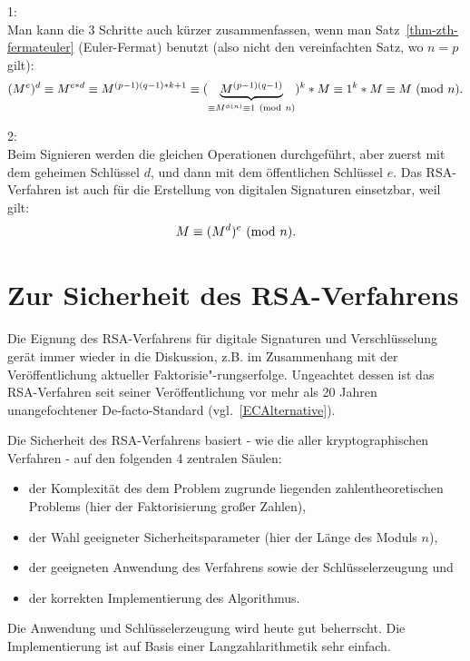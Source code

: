 \begin{refsegment}
\begin{remark}{ 1:}\\
Man kann die 3 Schritte auch kürzer zusammenfassen, wenn man
Satz~\ref{thm-zth-fermateuler} (Euler-Fermat) benutzt (also nicht den
vereinfachten Satz, wo $n = p$ gilt):
$$
(M^e)^d \equiv M^{e*d} \equiv M^{(p-1)(q-1)*k + 1} \equiv
        (\underbrace{M^{(p-1)(q-1)}}_{\equiv M^{\phi(n)} \equiv 1 {\rm ~(mod~}n)})^k * M
    \equiv 1^k * M \equiv M {\rm ~(mod~}n).
$$
\end{remark}


\begin{remark}{ 2:}\\
Beim Signieren werden die gleichen Operationen durchgeführt, aber zuerst mit
dem geheimen Schlüssel $d$, und dann mit dem öffentlichen Schlüssel $e$. Das
RSA-Verfahren ist auch für die Erstellung von digitalen
Signaturen
einsetzbar, weil gilt:
$$
M \equiv (M^d)^e{\rm ~(mod~}n).
$$
\end{remark}



\hypertarget{SecurityRSA}{}
\section[Zur Sicherheit des RSA-Verfahrens]
{Zur Sicherheit des RSA-Verfahrens\footnotemark}
    \label{SecurityRSA}

Die Eignung des RSA-Verfahrens für digitale Signaturen und Verschlüsselung gerät immer wieder in die Diskussion,
z.B. im Zusammenhang mit der Veröffentlichung aktueller Faktorisie"-rungserfolge. Ungeachtet dessen ist das RSA-Verfahren
seit seiner Veröffentlichung vor mehr als 20 Jahren unangefochtener
De-facto-Standard (vgl.~\ref{ECAlternative}).

Die Sicherheit des RSA-Verfahrens basiert - wie die aller kryptographischen Verfahren - auf den folgenden 4 zentralen
Säulen:
\begin{itemize}
\item der Komplexität des dem Problem zugrunde liegenden zahlentheoretischen Problems (hier der Faktorisierung
       großer Zahlen),
\item der Wahl geeigneter Sicherheitsparameter (hier der Länge des Moduls $n$),
\item der geeigneten Anwendung des Verfahrens sowie der Schlüsselerzeugung und
\item der korrekten Implementierung des Algorithmus.
\end{itemize}
Die Anwendung und Schlüsselerzeugung wird heute gut beherrscht.
Die Implementierung ist auf Basis einer Langzahlarithmetik sehr einfach.


\end{refsegment}
